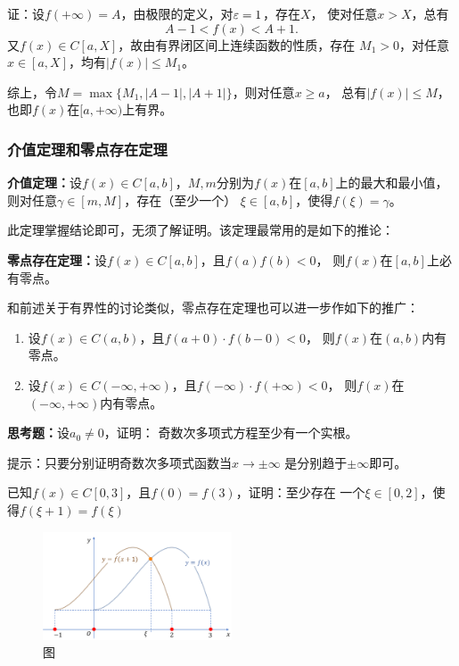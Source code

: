 证：设$f(+\infty)=A$，由极限的定义，对$\varepsilon=1$，存在$X$，
使对任意$x>X$，总有
$$A-1<f(x)<A+1.$$
又$f(x)\in C[a,X]$，故由有界闭区间上连续函数的性质，存在
$M_1>0$，对任意$x\in[a,X]$，均有$|f(x)|\leq M_1$。

综上，令$M=\max\{M_1,|A-1|,|A+1|\}$，则对任意$x\geq a$，
总有$|f(x)|\leq M$，也即$f(x)$在$[a,+\infty)$上有界。
\fin

\subsubsection{介值定理和零点存在定理}

\begin{thx}
	{\bf 介值定理：}设$f(x)\in C[a,b]$，$M,m$分别为$f(x)$在$[a,b]$上的最大和最小值，
	则对任意$\gamma\in[m,M]$，存在（至少一个）
	$\xi\in[a,b]$，使得$f(\xi)=\gamma$。
\end{thx}

此定理掌握结论即可，无须了解证明。该定理最常用的是如下的推论：

\begin{thx}
	{\bf 零点存在定理：}设$f(x)\in C[a,b]$，且$f(a)f(b)<0$，
	则$f(x)$在$[a,b]$上必有零点。
\end{thx}

和前述关于有界性的讨论类似，零点存在定理也可以进一步作如下的推广：
\begin{enumerate}[(1)]
  \setlength{\itemindent}{1cm}
  \item 设$f(x)\in C(a,b)$，且$f(a+0)\cdot f(b-0)<0$，
  则$f(x)$在$(a,b)$内有零点。
  \item 设$f(x)\in C(-\infty,+\infty)$，且$f(-\infty)
  \cdot f(+\infty)<0$，
  则$f(x)$在$(-\infty,+\infty)$内有零点。
\end{enumerate}

\bs
{\bf 思考题：}设$a_0\ne 0$，证明：
奇数次多项式方程至少有一个实根。

\ifhint
提示：只要分别证明奇数次多项式函数当$x\to\pm\infty$
是分别趋于$\pm\infty$即可。
\fi

\bs
\egz 已知$f(x)\in C[0,3]$，且$f(0)=f(3)$，证明：至少存在
一个$\xi\in[0,2]$，使得$f(\xi+1)=f(\xi)$
	
\begin{figure}[h]
	\centering
	\includegraphics[width=0.5\textwidth]{./Images/Ch01/fxx1xi.pdf}
	\caption{\exNo 图}
	\label{fig:fxx1xi}
\end{figure}

